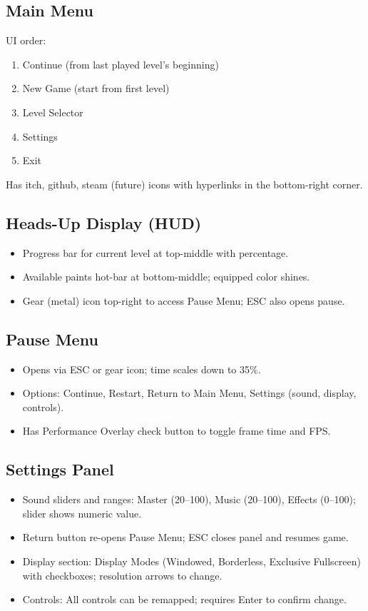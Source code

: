 \documentclass[11pt,a4paper]{report}
\begin{document}
\subsection{Main Menu}
UI order:
\begin{enumerate}
  \item Continue (from last played level's beginning)
  \item New Game (start from first level)
  \item Level Selector
  \item Settings
  \item Exit
\end{enumerate}
Has itch, github, steam (future) icons with hyperlinks in the bottom-right corner.

\subsection{Heads-Up Display (HUD)}
\begin{itemize}
  \item Progress bar for current level at top-middle with percentage.
  \item Available paints hot-bar at bottom-middle; equipped color shines.
  \item Gear (metal) icon top-right to access Pause Menu; ESC also opens pause.
\end{itemize}

\subsection{Pause Menu}
\begin{itemize}
  \item Opens via ESC or gear icon; time scales down to 35\%.
  \item Options: Continue, Restart, Return to Main Menu, Settings (sound, display, controls).
  \item Has Performance Overlay check button to toggle frame time and FPS.
\end{itemize}

\subsection{Settings Panel}
\begin{itemize}
  \item Sound sliders and ranges: Master (20--100), Music (20--100), Effects (0--100); slider shows numeric value.
  \item Return button re-opens Pause Menu; ESC closes panel and resumes game.
  \item Display section: Display Modes (Windowed, Borderless, Exclusive Fullscreen) with checkboxes; resolution arrows to change.
  \item Controls: All controls can be remapped; requires Enter to confirm change.
\end{itemize}
\end{document}

